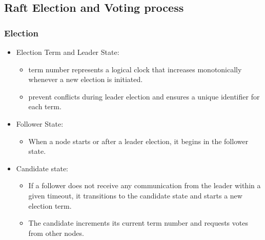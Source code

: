 \subsection{Raft Election and Voting process}
\subsubsection{Election}

\begin{itemize}
	\item Election Term and Leader State:
	      \begin{itemize}
		      \item term number represents a logical clock that increases monotonically whenever a new election is initiated.
		      \item prevent conflicts during leader election and ensures a unique identifier for each term.
	      \end{itemize}

	\item Follower State:
	      \begin{itemize}
		      \item When a node starts or after a leader election, it begins in the follower state.

	      \end{itemize}
	\item Candidate state:
	      \begin{itemize}
		      \item If a follower does not receive any communication from the leader within a given timeout, it transitions to the candidate state and starts a new election term.
		      \item The candidate increments its current term number and requests votes from other nodes.
	      \end{itemize}
\end{itemize}

